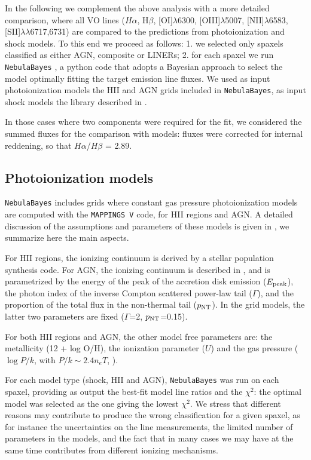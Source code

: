 \documentclass[fleqn,usenatbib]{mnras}
\begin{document}
In the following we complement the above analysis with a more detailed comparison, where 
all VO lines ($H\alpha$, H$\beta$, [OI]$\lambda$6300, [OIII]$\lambda$5007, [NII]$\lambda$6583, [SII]$\lambda\lambda$6717,6731) are compared to the predictions from  photoionization and shock models. To this end we proceed as follows: 1. we selected only spaxels classified as either AGN, composite or LINERs; 2. for each spaxel we run   \texttt{NebulaBayes} \citep{2018ApJ...856...89T}, a python code that adopts a Bayesian approach to select the model  optimally fitting the target emission line fluxes. We used as input photoionization models the HII and AGN grids included in \texttt{NebulaBayes},  as input shock models the library described in \citet{2008ApJS..178...20A}.

In those cases where two components were required for the fit,  we considered the summed fluxes for the comparison with models: fluxes were corrected for internal reddening, so that $H\alpha$/$H\beta$ = 2.89.


\subsection{Photoionization models}

\texttt{NebulaBayes} includes grids where constant gas pressure photoionization models are computed with the \texttt{MAPPINGS V} code, for HII regions and AGN. A detailed discussion of the assumptions and parameters of these models is given in  \citet{2018ApJ...856...89T}, we summarize here the  main aspects.

For HII regions, the ionizing continuum is derived by a stellar population synthesis code.
For AGN, the ionizing continuum is described in \citet{2016ApJ...833..266T}, and is parametrized by the energy of the peak of the accretion disk emission ($E_{\rm peak}$),  the photon index of the
inverse Compton scattered power-law tail ($\Gamma$), and the proportion
of the total flux in the non-thermal tail ($p_{\rm NT}$). In the grid models, the latter two parameters are fixed ($\Gamma$=2, $p_{\rm NT}$=0.15).

For both HII regions and AGN, the other model free parameters are: the metallicity (12 + log O/H), the ionization parameter ($U$) and  the gas pressure ($\log P/k$, with $P/k \sim 2.4 n_e T$, \cite[see e.g.][]{2018arXiv180602839K}). 

For each model type (shock, HII and AGN), \texttt{NebulaBayes} was run on each spaxel, providing as output  the best-fit model line ratios and the $\chi^2$: the optimal model was selected as the one giving the lowest $\chi^2$. 
We stress that different reasons may contribute to produce the wrong classification for a given spaxel, as for instance the uncertainties on the line measurements, the limited number of parameters in the models, and the fact that in many cases we may have at the same time contributes from different ionizing mechanisms.
\end{document}

